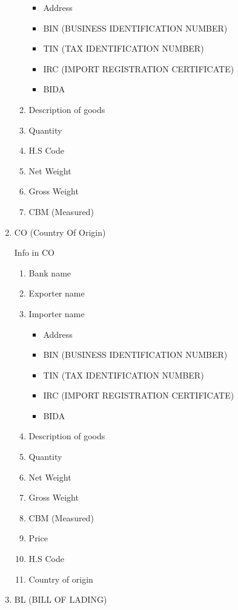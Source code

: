 \documentclass[10pt]{article}
\begin{document}
\begin{enumerate}
\begin{enumerate}
\begin{itemize}
        \item Address
        \item BIN (BUSINESS IDENTIFICATION NUMBER)
        \item TIN (TAX IDENTIFICATION NUMBER)
        \item IRC (IMPORT REGISTRATION CERTIFICATE)
        \item BIDA
\end{itemize}
        \item Description of goods
        \item Quantity
        \item H.S Code
        \item Net Weight
        \item Gross Weight
        \item CBM (Measured)
\end{enumerate}
    \item CO (Country Of Origin)
\begin{description}
    \item [Info in CO]
\end{description}
\begin{enumerate}
    \item Bank name
    \item Exporter name 
    \item Importer name 
\begin{itemize}
        \item Address
        \item BIN (BUSINESS IDENTIFICATION NUMBER)
        \item TIN (TAX IDENTIFICATION NUMBER)
        \item IRC (IMPORT REGISTRATION CERTIFICATE)
        \item BIDA
\end{itemize}
        \item Description of goods
        \item Quantity
        \item Net Weight
        \item Gross Weight
        \item CBM (Measured)
        \item Price
        \item H.S Code
        \item Country of origin
\end{enumerate}
    \item BL (BILL OF LADING)
\begin{description}

\end{description}
\end{enumerate}
\end{document}
